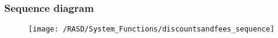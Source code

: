 \subsubsection{Sequence diagram}
\begin{figure}[!ht]
  \centering
  \vspace{0.2cm}
  \texttt{[image: /RASD/System\_Functions/discountsandfees\_sequence]}\\
  \vspace{0.1cm}
  \label{fig:discountsandfees_sequence} 
\end{figure}

